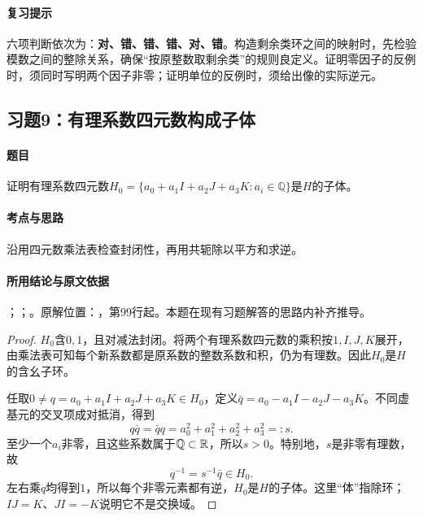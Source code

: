 \paragraph{复习提示}

六项判断依次为：\textbf{对、错、错、错、对、错}。构造剩余类环之间的映射时，先检验模数之间的整除关系，确保“按原整数取剩余类”的规则良定义。证明零因子的反例时，须同时写明两个因子非零；证明单位的反例时，须给出像的实际逆元。



\subsection{习题9：有理系数四元数构成子体}

\label{ex:3:9}

\paragraph{题目}

证明有理系数四元数$H_0=\{a_0+a_1I+a_2J+a_3K:a_i\in\mathbb Q\}$是$H$的子体。

\paragraph{考点与思路}

沿用四元数乘法表检查封闭性，再用共轭除以平方和求逆。

\paragraph{所用结论与原文依据}

；；。原解位置：，第99行起。本题在现有习题解答的思路内补齐推导。


\begin{proof}

$H_0$含$0,1$，且对减法封闭。将两个有理系数四元数的乘积按$1,I,J,K$展开，由乘法表可知每个新系数都是原系数的整数系数和积，仍为有理数。因此$H_0$是$H$的含幺子环。

任取$0\ne q=a_0+a_1I+a_2J+a_3K\in H_0$，定义$\bar q=a_0-a_1I-a_2J-a_3K$。不同虚基元的交叉项成对抵消，得到
\[
q\bar q=\bar q q=a_0^2+a_1^2+a_2^2+a_3^2=:s.
\]
至少一个$a_i$非零，且这些系数属于$\mathbb Q\subset\mathbb R$，所以$s>0$。特别地，$s$是非零有理数，故
\[
q^{-1}=s^{-1}\bar q\in H_0.
\]
左右乘$q$均得到$1$，所以每个非零元素都有逆，$H_0$是$H$的子体。这里“体”指除环；$IJ=K$、$JI=-K$说明它不是交换域。

\end{proof}

